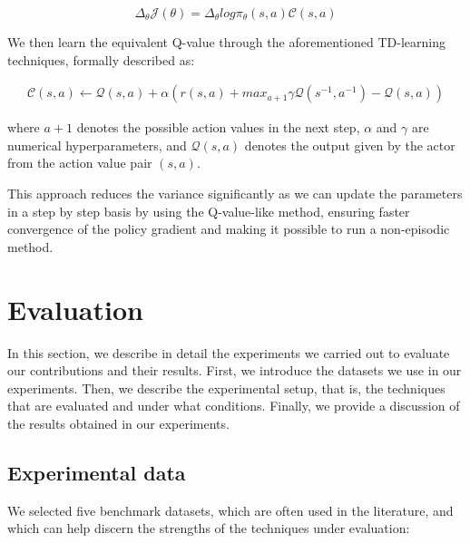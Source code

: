 \begin{equation}
\label{eq:ActorCritic}
    \Delta_{\theta}\mathcal{J}(\theta) =\Delta_{\theta}log\pi_{\theta}(s,a)\mathcal{C}(s,a) 
\end{equation}

We then learn the equivalent Q-value through the aforementioned TD-learning techniques, formally described as:

\begin{equation}
\label{eq:TemporalDifference}
\begin{split}
    \mathcal{C}(s,a) \gets \mathcal{Q}(s,a) + \alpha(r(s,a) + max_{a+1} \gamma \mathcal{Q}(s^{-1},a^{-1}) - \mathcal{Q}(s,a))
\end{split}
\end{equation}

where $a+1$ denotes the possible action values in the next step, $\alpha$ and $\gamma$ are numerical hyperparameters, and $\mathcal{Q}(s,a)$ denotes the output given by the actor from the action value pair $(s,a)$.

This approach reduces the variance significantly as we can update the parameters in a step by step basis by using the Q-value-like method, ensuring faster convergence of the policy gradient and making it possible to run a non-episodic method.

\section{Evaluation}\label{sec:spacerl-evaluation}
In this section, we describe in detail the experiments we carried out to evaluate our contributions and their results. First, we introduce the datasets we use in our experiments. Then, we describe the experimental setup, that is, the techniques that are evaluated and under what conditions. Finally, we provide a discussion of the results obtained in our experiments.


\subsection{Experimental data}

We selected five benchmark datasets, which are often used in the literature, and which can help discern the strengths of the techniques under evaluation:

